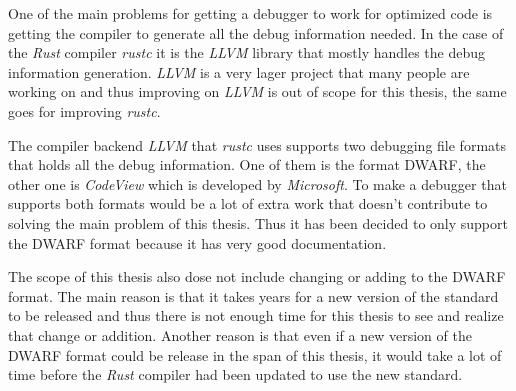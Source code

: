 




One of the main problems for getting a debugger to work for optimized code is getting the compiler to generate all the debug information needed.
In the case of the \emph{Rust} compiler \emph{rustc} it is the \emph{LLVM} library that mostly handles the debug information generation.
\emph{LLVM} is a very lager project that many people are working on and thus improving on \emph{LLVM} is out of scope for this thesis, the same goes for improving \emph{rustc}.


The compiler backend \emph{LLVM} that \emph{rustc} uses supports two debugging file formats that holds all the debug information.
One of them is the format \gls{DWARF}, the other one is \emph{CodeView} which is developed by \emph{Microsoft}.
To make a debugger that supports both formats would be a lot of extra work that doesn't contribute to solving the main problem of this thesis.
Thus it has been decided to only support the \gls{DWARF} format because it has very good documentation.


The scope of this thesis also dose not include changing or adding to the \gls{DWARF} format.
The main reason is that it takes years for a new version of the standard to be released and thus there is not enough time for this thesis to see and realize that change or addition.
Another reason is that even if a new version of the \gls{DWARF} format could be release in the span of this thesis, it would take a lot of time before the \emph{Rust} compiler had been updated to use the new standard.


